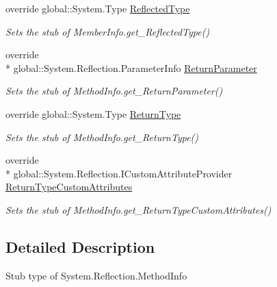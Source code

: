 \begin{DoxyCompactItemize}
override global\-::\-System.\-Type \hyperlink{class_system_1_1_reflection_1_1_fakes_1_1_stub_method_info_a900d45b6603f7d99cdc0db9f4550e41c}{Reflected\-Type}
\begin{DoxyCompactList}\small\item\em Sets the stub of Member\-Info.\-get\-\_\-\-Reflected\-Type()\end{DoxyCompactList}\item 
override \\*
global\-::\-System.\-Reflection.\-Parameter\-Info \hyperlink{class_system_1_1_reflection_1_1_fakes_1_1_stub_method_info_a5599a51d94fd18e014da4c98f3b340a8}{Return\-Parameter}
\begin{DoxyCompactList}\small\item\em Sets the stub of Method\-Info.\-get\-\_\-\-Return\-Parameter()\end{DoxyCompactList}\item 
override global\-::\-System.\-Type \hyperlink{class_system_1_1_reflection_1_1_fakes_1_1_stub_method_info_a7478ecc705665a090c4aa501a842a5ee}{Return\-Type}
\begin{DoxyCompactList}\small\item\em Sets the stub of Method\-Info.\-get\-\_\-\-Return\-Type()\end{DoxyCompactList}\item 
override \\*
global\-::\-System.\-Reflection.\-I\-Custom\-Attribute\-Provider \hyperlink{class_system_1_1_reflection_1_1_fakes_1_1_stub_method_info_a80314d1e2d3558c5f4f2da9d249f73c8}{Return\-Type\-Custom\-Attributes}
\begin{DoxyCompactList}\small\item\em Sets the stub of Method\-Info.\-get\-\_\-\-Return\-Type\-Custom\-Attributes()\end{DoxyCompactList}\end{DoxyCompactItemize}


\subsection{Detailed Description}
Stub type of System.\-Reflection.\-Method\-Info



